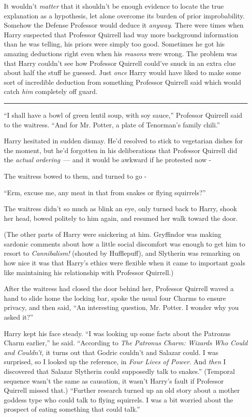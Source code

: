 It wouldn't \emph{matter} that it shouldn't be enough evidence to locate the true explanation as a hypothesis, let alone overcome its burden of prior improbability. Somehow the Defense Professor would deduce it \emph{anyway}. There were times when Harry suspected that Professor Quirrell had way more background information than he was telling, his priors were simply too good. Sometimes he got his amazing deductions right even when his \emph{reasons} were wrong. The problem was that Harry couldn't see how Professor Quirrell could've snuck in an extra clue about half the stuff he guessed. Just \emph{once} Harry would have liked to make some sort of incredible deduction from something Professor Quirrell said which would catch \emph{him} completely off guard.

\begin{center}\rule{3in}{0.4pt}\end{center}

``I shall have a bowl of green lentil soup, with soy sauce,'' Professor Quirrell said to the waitress. ``And for Mr. Potter, a plate of Tenorman's family chili.''

Harry hesitated in sudden dismay. He'd resolved to stick to vegetarian dishes for the moment, but he'd forgotten in his deliberations that Professor Quirrell did the \emph{actual ordering}~--- and it would be awkward if he protested now -

The waitress bowed to them, and turned to go -

``Erm, excuse me, any meat in that from snakes or flying squirrels?''

The waitress didn't so much as blink an eye, only turned back to Harry, shook her head, bowed politely to him again, and resumed her walk toward the door.

(The other parts of Harry were snickering at him. Gryffindor was making sardonic comments about how a little social discomfort was enough to get him to resort to \emph{Cannibalism!} (shouted by Hufflepuff), and Slytherin was remarking on how nice it was that Harry's ethics were flexible when it came to important goals like maintaining his relationship with Professor Quirrell.)

After the waitress had closed the door behind her, Professor Quirrell waved a hand to slide home the locking bar, spoke the usual four Charms to ensure privacy, and then said, ``An interesting question, Mr. Potter. I wonder why you asked it?''

Harry kept his face steady. ``I was looking up some facts about the Patronus Charm earlier,'' he said. ``According to \emph{The Patronus Charm: Wizards Who Could and Couldn't,} it turns out that Godric couldn't and Salazar could. I was surprised, so I looked up the reference, in \emph{Four Lives of Power.} And \emph{then} I discovered that Salazar Slytherin could supposedly talk to snakes.'' (Temporal sequence wasn't the same as causation, it wasn't Harry's fault if Professor Quirrell missed that.) ``Further research turned up an old story about a mother goddess type who could talk to flying squirrels. I was a bit worried about the prospect of eating something that could talk.''

